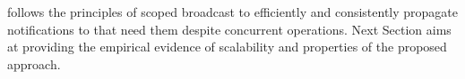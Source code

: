 



\NAME follows the principles of scoped broadcast to efficiently and
consistently propagate notifications to \processes that need them
despite concurrent operations. Next Section aims at providing the
empirical evidence of scalability and properties of the proposed
approach.

